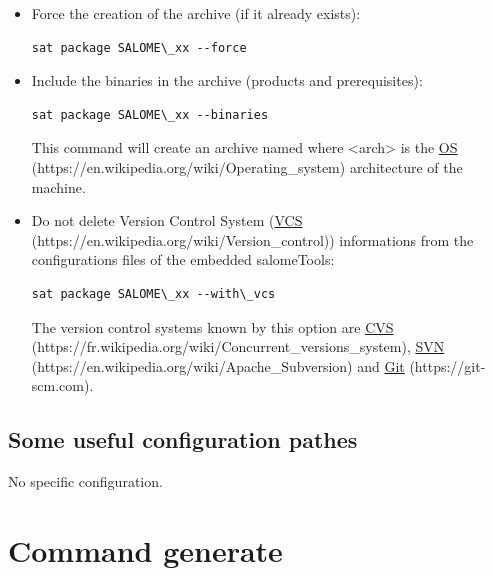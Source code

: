 \documentclass[a4paper,10pt,english]{sphinxmanual}
\begin{document}
\begin{itemize}
\item {} 
Force the creation of the archive (if it already exists):

\begin{Verbatim}[commandchars=\\\{\}]
sat package SALOME\_xx --force
\end{Verbatim}

\item {} 
Include the binaries in the archive (products and prerequisites):

\begin{Verbatim}[commandchars=\\\{\}]
sat package SALOME\_xx --binaries
\end{Verbatim}

This command will create an archive named 
where \textless{}arch\textgreater{} is the \href{https://en.wikipedia.org/wiki/Operating\_system}{OS} (https://en.wikipedia.org/wiki/Operating\_system) architecture of the machine.

\item {} 
Do not delete Version Control System (\href{https://en.wikipedia.org/wiki/Version\_control}{VCS} (https://en.wikipedia.org/wiki/Version\_control)) informations from the configurations files of the embedded salomeTools:

\begin{Verbatim}[commandchars=\\\{\}]
sat package SALOME\_xx --with\_vcs
\end{Verbatim}

The version control systems known by this option are \href{https://fr.wikipedia.org/wiki/Concurrent\_versions\_system}{CVS} (https://fr.wikipedia.org/wiki/Concurrent\_versions\_system), \href{https://en.wikipedia.org/wiki/Apache\_Subversion}{SVN} (https://en.wikipedia.org/wiki/Apache\_Subversion) and \href{https://git-scm.com}{Git} (https://git-scm.com).

\end{itemize}


\subsection{Some useful configuration pathes}
\label{commands/package:some-useful-configuration-pathes}
No specific configuration.
\clearpage

\section{Command generate}
\label{commands/generate:svn}\label{commands/generate:command-generate}\label{commands/generate::doc}
\end{document}
